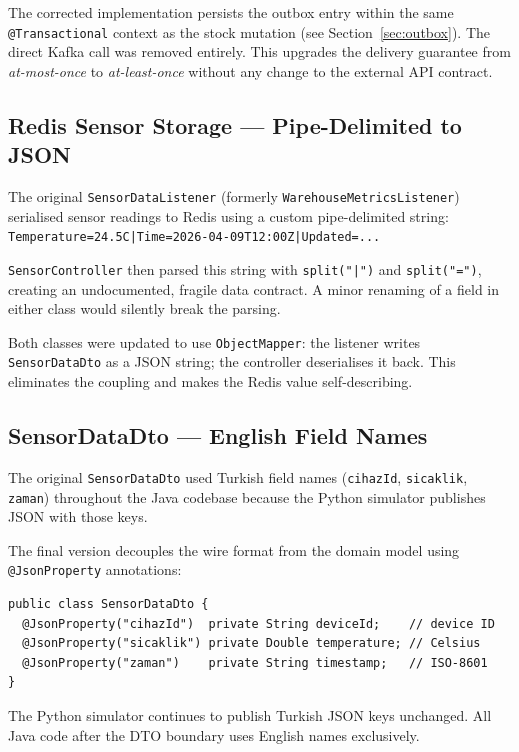 \documentclass[12pt,a4paper,twoside]{article}
\begin{document}
The corrected implementation persists the outbox entry within the same
\texttt{@Transactional} context as the stock mutation (see
Section~\ref{sec:outbox}). The direct Kafka call was removed entirely.
This upgrades the delivery guarantee from \emph{at-most-once} to
\emph{at-least-once} without any change to the external API contract.

\subsection{Redis Sensor Storage --- Pipe-Delimited to JSON}

The original \texttt{SensorDataListener} (formerly
\texttt{WarehouseMetricsListener}) serialised sensor readings to Redis using
a custom pipe-delimited string:
\texttt{Temperature=24.5\textdegree{}C|Time=2026-04-09T12:00Z|Updated=...}

\texttt{SensorController} then parsed this string with \texttt{split("|")}
and \texttt{split("=")}, creating an undocumented, fragile data contract.
A minor renaming of a field in either class would silently break the parsing.

Both classes were updated to use \texttt{ObjectMapper}: the listener writes
\texttt{SensorDataDto} as a JSON string; the controller deserialises it back.
This eliminates the coupling and makes the Redis value self-describing.

\subsection{SensorDataDto --- English Field Names}

The original \texttt{SensorDataDto} used Turkish field names
(\texttt{cihazId}, \texttt{sicaklik}, \texttt{zaman}) throughout the Java
codebase because the Python simulator publishes JSON with those keys.

The final version decouples the wire format from the domain model using
\texttt{@JsonProperty} annotations:

\begin{lstlisting}[style=javaStyle,
  caption={SensorDataDto: wire-format isolation via @JsonProperty}]
public class SensorDataDto {
  @JsonProperty("cihazId")  private String deviceId;    // device ID
  @JsonProperty("sicaklik") private Double temperature; // Celsius
  @JsonProperty("zaman")    private String timestamp;   // ISO-8601
}
\end{lstlisting}

The Python simulator continues to publish Turkish JSON keys unchanged.
All Java code after the DTO boundary uses English names exclusively.
\end{document}
